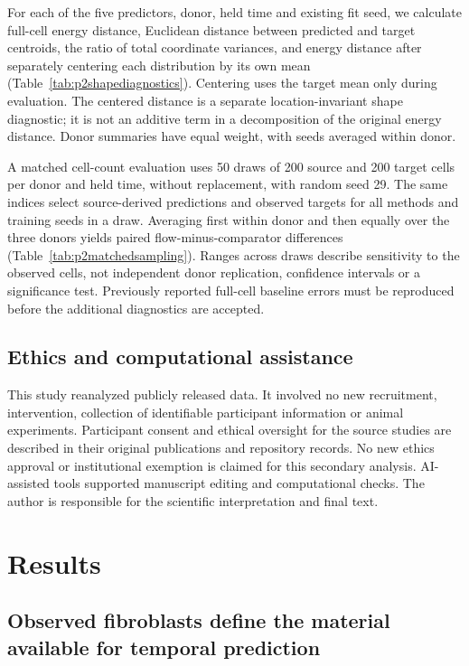 \documentclass[10pt,a4paper]{article}
\begin{document}
For each of the five predictors, donor, held time and existing fit seed, we calculate full-cell energy distance, Euclidean distance between predicted and target centroids, the ratio of total coordinate variances, and energy distance after separately centering each distribution by its own mean (Table~\ref{tab:p2shapediagnostics}). Centering uses the target mean only during evaluation. The centered distance is a separate location-invariant shape diagnostic; it is not an additive term in a decomposition of the original energy distance. Donor summaries have equal weight, with seeds averaged within donor.

A matched cell-count evaluation uses 50 draws of 200 source and 200 target cells per donor and held time, without replacement, with random seed 29. The same indices select source-derived predictions and observed targets for all methods and training seeds in a draw. Averaging first within donor and then equally over the three donors yields paired flow-minus-comparator differences (Table~\ref{tab:p2matchedsampling}). Ranges across draws describe sensitivity to the observed cells, not independent donor replication, confidence intervals or a significance test. Previously reported full-cell baseline errors must be reproduced before the additional diagnostics are accepted.


\subsection{Ethics and computational assistance}
This study reanalyzed publicly released data. It involved no new recruitment, intervention, collection of identifiable participant information or animal experiments. Participant consent and ethical oversight for the source studies are described in their original publications and repository records. No new ethics approval or institutional exemption is claimed for this secondary analysis.
AI-assisted tools supported manuscript editing and computational checks. The author is responsible for the scientific interpretation and final text.

\section{Results}
\subsection{Observed fibroblasts define the material available for temporal prediction}
\end{document}

